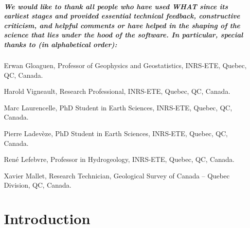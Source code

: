 \documentclass[10pt, letterpaper, fleqn]{report}
\begin{document}
\paragraph{We would like to thank all people who have used WHAT since its earliest stages and provided essential technical feedback, constructive criticism, and helpful comments or have helped in the shaping of the science that lies under the hood of the software.
In particular, special thanks to (in alphabetical order):}
\begin{description}
\item{Erwan Gloaguen, Professor of Geophysics and Geostatistics, INRS-ETE, Quebec, QC, Canada.}
\item{Harold Vigneault, Research Professional, INRS-ETE, Quebec, QC, Canada.}
\item{Marc Laurencelle, PhD Student in Earth Sciences, INRS-ETE, Quebec, QC, Canada.}
\item{Pierre Ladevèze, PhD Student in Earth Sciences, INRS-ETE, Quebec, QC, Canada.}
\item{René Lefebvre, Professor in Hydrogeology, INRS-ETE, Quebec, QC, Canada.}
\item{Xavier Mallet, Research Technician, Geological Survey of Canada – Quebec Division, QC, Canada.}
\end{description}

\newpage

\chapter*{Introduction}
\end{document}
